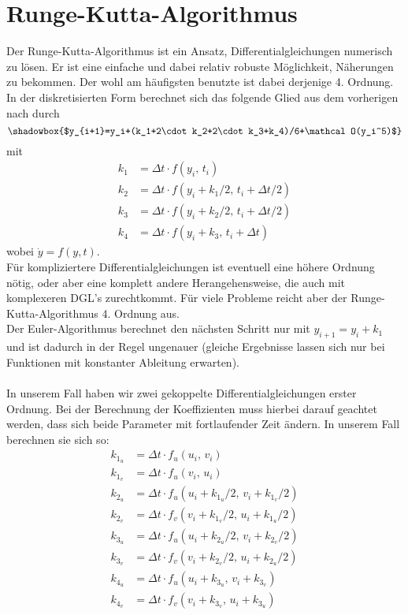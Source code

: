 \documentclass[12pt,a4paper,titlepage,headinclude,bibtotoc]{scrartcl}
\begin{document}
\section{Runge-Kutta-Algorithmus}
Der Runge-Kutta-Algorithmus ist ein Ansatz, Differentialgleichungen numerisch zu lösen.
Er ist eine einfache und dabei relativ robuste Möglichkeit, Näherungen zu bekommen.
Der wohl am häufigsten benutzte ist dabei derjenige 4. Ordnung.
In der diskretisierten Form berechnet sich das folgende Glied aus dem vorherigen nach \cite[S.130]{scientificcomp} durch
$$\shadowbox{$y_{i+1}=y_i+(k_1+2\cdot k_2+2\cdot k_3+k_4)/6+\mathcal O(y_i^5)$}$$ 
mit
\begin{align*}
k_1&=\Delta t\cdot f(y_i,\, t_i)\\
k_2&=\Delta t\cdot f(y_i+k_1/2,\, t_i+\Delta t/2)\\
k_3&=\Delta t\cdot f(y_i+k_2/2,\, t_i+\Delta t/2)\\
k_4&=\Delta t\cdot f(y_i+k_3,\, t_i+\Delta t)
\end{align*}
wobei $\dot y=f(y,t)$.\\
Für kompliziertere Differentialgleichungen ist eventuell eine höhere Ordnung nötig, oder aber eine komplett andere Herangehensweise, die auch mit komplexeren DGL's zurechtkommt.
Für viele Probleme reicht aber der Runge-Kutta-Algorithmus 4. Ordnung aus.\\
Der Euler-Algorithmus berechnet den nächsten Schritt nur mit $y_{i+1}=y_i+k_1$ und ist dadurch in der Regel ungenauer (gleiche Ergebnisse lassen sich nur bei Funktionen mit konstanter Ableitung erwarten).\\\\
In unserem Fall haben wir zwei gekoppelte Differentialgleichungen erster Ordnung.
Bei der Berechnung der Koeffizienten muss hierbei darauf geachtet werden, dass sich beide Parameter mit fortlaufender Zeit ändern.
In unserem Fall berechnen sie sich so:
\begin{align*}
k_{1_u}&=\Delta t\cdot f_u(u_i,\, v_i)\\
k_{1_v}&=\Delta t\cdot f_u(v_i,\, u_i)\\
k_{2_u}&=\Delta t\cdot f_u(u_i+k_{1_u}/2,\, v_i+k_{1_v}/2)\\
k_{2_v}&=\Delta t\cdot f_v(v_i+k_{1_v}/2,\, u_i+k_{1_u}/2)\\
k_{3_u}&=\Delta t\cdot f_u(u_i+k_{2_u}/2,\, v_i+k_{2_v}/2)\\
k_{3_v}&=\Delta t\cdot f_v(v_i+k_{2_v}/2,\, u_i+k_{2_u}/2)\\
k_{4_u}&=\Delta t\cdot f_u(u_i+k_{3_u},\, v_i+k_{3_v})\\
k_{4_v}&=\Delta t\cdot f_v(v_i+k_{3_v},\, u_i+k_{3_u})
\end{align*}
\end{document}
